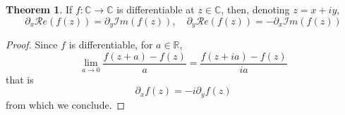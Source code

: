 \documentclass{report}
\theoremstyle{definition}
\newtheorem{theorem}{Theorem}
\begin{document}
\begin{theorem}
  \label{cauchyRiemann}
  If $f:\mathbb C\to\mathbb C$ is differentiable at $z\in\mathbb C$, then, denoting $z=x+iy$,
  \begin{equation}
    \partial_x\mathcal Re(f(z))=\partial_y\mathcal Im(f(z))
    ,\quad
    \partial_y\mathcal Re(f(z))=-\partial_x\mathcal Im(f(z))
  \end{equation}
\end{theorem}

\begin{proof}
  Since $f$ is differentiable, for $a\in\mathbb R$,
  \begin{equation}
    \lim_{a\to0}\frac{f(z+a)-f(z)}a=\frac{f(z+ia)-f(z)}{ia}
  \end{equation}
  that is
  \begin{equation}
    \partial_x f(z)=-i\partial_y f(z)
  \end{equation}
  from which we conclude.
\end{proof}
\end{document}

